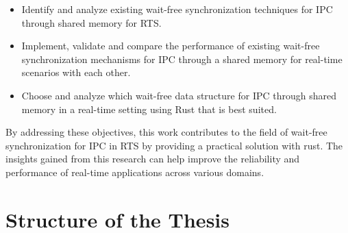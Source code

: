 \begin{itemize}
\item Identify and analyze existing wait-free synchronization techniques for \ac{IPC} through shared memory for \ac{RTS}.
\item Implement, validate and compare the performance of existing wait-free synchronization mechanisms for \ac{IPC} through a shared memory for real-time scenarios with each other.
\item Choose and analyze which wait-free data structure for \ac{IPC} through shared memory in a real-time setting using Rust that is best suited.
\end{itemize}

By addressing these objectives, this work contributes to the field of wait-free synchronization for \ac{IPC} in \ac{RTS} by providing a practical solution with rust. The insights gained from this research can help improve the reliability and performance of real-time applications across various domains.

\section{Structure of the Thesis}\label{sec:structure-of-the-thesis}


